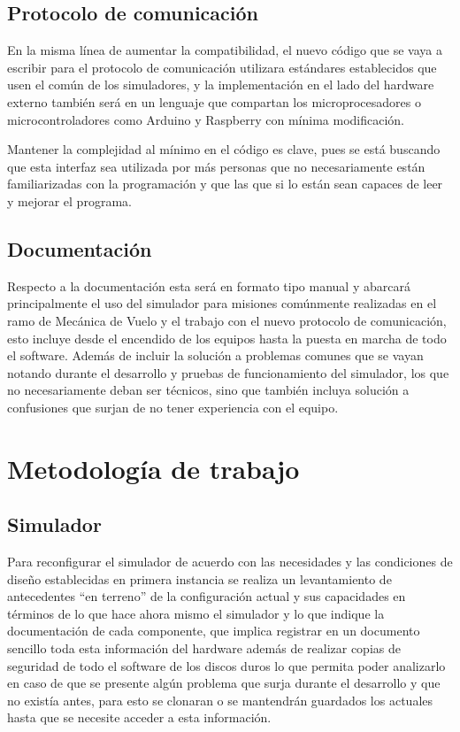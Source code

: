 \documentclass[12pt]{report}
\begin{document}
\section{Protocolo de comunicación}

En la misma línea de aumentar la compatibilidad, el nuevo código que se vaya a escribir para el protocolo de comunicación utilizara estándares establecidos que usen el común de los simuladores, y la implementación en el lado del hardware externo también será en un lenguaje que compartan los microprocesadores o microcontroladores como Arduino y Raspberry con mínima modificación.

Mantener la complejidad al mínimo en el código es clave, pues se está buscando que esta interfaz sea utilizada por más personas que no necesariamente están familiarizadas con la programación y que las que si lo están sean capaces de leer y mejorar el programa.

\section{Documentación}

Respecto a la documentación esta será en formato tipo manual y abarcará principalmente el uso del simulador para misiones comúnmente realizadas en el ramo de Mecánica de Vuelo y el trabajo con el nuevo protocolo de comunicación, esto incluye desde el encendido de los equipos hasta la puesta en marcha de todo el software. Además de incluir la solución a problemas comunes que se vayan notando durante el desarrollo y pruebas de funcionamiento del simulador, los que no necesariamente deban ser técnicos, sino que también incluya solución a confusiones que surjan de no tener experiencia con el equipo.

\chapter{Metodología de trabajo}

\section{Simulador}

Para reconfigurar el simulador de acuerdo con las necesidades y las condiciones de diseño establecidas en primera instancia se realiza un levantamiento de antecedentes “en terreno” de la configuración actual y sus capacidades en términos de lo que hace ahora mismo el simulador y lo que indique la documentación de cada componente, que implica registrar en un documento sencillo toda esta información del hardware además de realizar copias de seguridad de todo el software de los discos duros lo que permita poder analizarlo en caso de que se presente algún problema que surja durante el desarrollo y que no existía antes, para esto se clonaran o se mantendrán guardados los actuales hasta que se necesite acceder a esta información.
\end{document}
